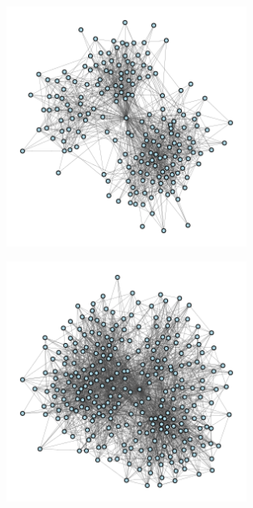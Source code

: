 \documentclass[12pt]{article}
\begin{document}
\begin{appendix}
\begin{figure}
\end{figure}
\begin{figure}
  \centering
  \caption{\protect}
  \includegraphics[width=0.7\textwidth]{../3_results/town_5.png} \\
\end{figure}
\begin{figure}
  \centering
  \caption{\protect}
  \includegraphics[width=0.7\textwidth]{../3_results/town_6.png} \\
\end{figure}
\begin{figure}
  \centering
  \caption{\protect}

\end{figure}
\end{appendix}
\end{document}

